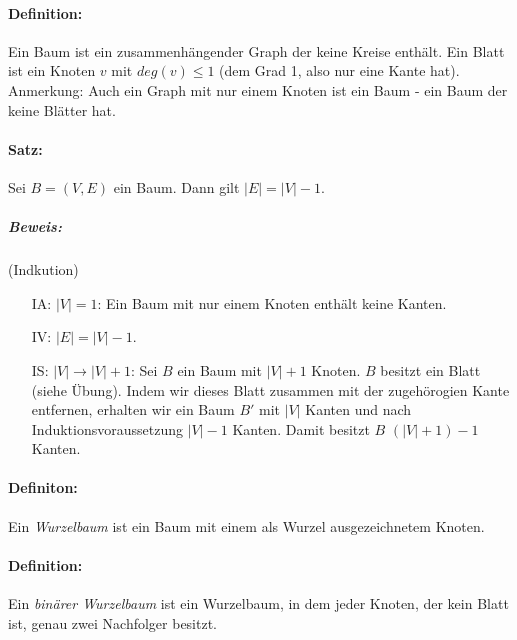\paragraph{Definition:} Ein Baum ist ein zusammenhängender Graph der keine Kreise enthält. Ein Blatt ist ein Knoten $v$ mit $deg(v)\leq 1$ (dem Grad 1, also nur eine Kante hat).\\
Anmerkung: Auch ein Graph mit nur einem Knoten ist ein Baum - ein Baum der keine Blätter hat.

\paragraph{Satz:} Sei $B=(V,E)$ ein Baum. Dann gilt $|E|=|V|-1$.

\subparagraph{Beweis:} (Indkution)
\begin{itemize}
\item[IA:] $|V|=1$: Ein Baum mit nur einem Knoten enthält keine Kanten.
\item[IV:] $|E|=|V|-1$.
\item[IS:]$|V| \rightarrow |V| +1$: Sei $B$ ein Baum mit $|V|+1$ Knoten. $B$ besitzt ein Blatt (siehe Übung). Indem wir dieses Blatt zusammen mit der zugehörogien Kante entfernen, erhalten wir ein Baum $B'$ mit $|V|$ Kanten und nach Induktionsvoraussetzung $|V|-1$ Kanten. Damit besitzt $B$ $(|V|+1)-1$ Kanten.
\end{itemize}

\paragraph{Definiton:} Ein \emph{Wurzelbaum} ist ein Baum mit einem als Wurzel ausgezeichnetem Knoten.

\paragraph{Definition:} Ein \emph{binärer Wurzelbaum} ist ein Wurzelbaum, in dem jeder Knoten, der kein Blatt ist, genau zwei Nachfolger besitzt.\\
